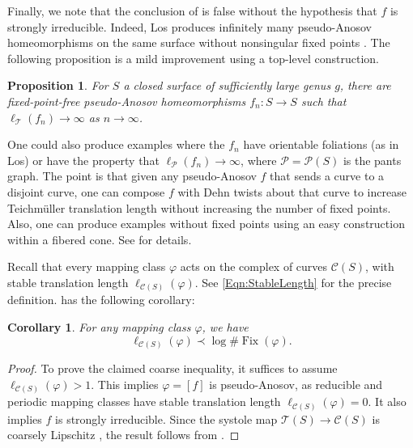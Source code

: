 \documentclass[11pt,letterpaper]{amsart}
\newcommand{\mc}{\mathcal}
\newcommand{\teich}{\mathcal T}
\newcommand{\Fix}{\operatorname{Fix}}
\numberwithin{equation}{section}
\newtheorem{proposition}[theorem]{Proposition}
\newtheorem{corollary}[theorem]{Corollary}
\theoremstyle{definition}
\newcommand{\T}{\mathcal{T}}
\newcommand{\C}{\mathcal{C}}
\begin{document}
Finally, we note that the conclusion of  is false without the hypothesis that $f$ is strongly irreducible. Indeed, Los produces infinitely many pseudo-Anosov homeomorphisms on the same surface without nonsingular fixed points \cite{Los:Infinite}. The following proposition is a mild improvement using a top-level construction. 





\begin{proposition}\label{prop:FPF}
For $S$ a closed surface of sufficiently large genus $g$, there are fixed-point-free pseudo-Anosov homeomorphisms $f_n \colon S \to S$ such that $\ell_{\T}(f_n) \to \infty$ as $n \to \infty$.
\end{proposition}


One could also produce examples where the $f_n$ have orientable foliations (as in Los) or have the property that $\ell_{\mc P}(f_n) \to \infty$, where $\mc P = \mc P(S)$ is the pants graph. 
%
The point is that given any pseudo-Anosov $f$ that sends a curve to a disjoint curve, one can compose $f$ with Dehn twists about that curve to increase Teichm\"uller translation length without increasing the number of fixed points. Also, one can produce examples without fixed points using an easy construction within a fibered cone.
See  for details.


Recall that every mapping class $\varphi$ acts on the complex of curves $\C(S)$, with stable translation length $\ell_{\C(S)}(\varphi)$. 
See \eqref{Eqn:StableLength} for the precise definition. 
 has the following corollary:

\begin{corollary}\label{Cor:CurveGraphFixedPoints}
For any mapping class $\varphi$,
we have
\[
\ell_{\C(S)}(\varphi) \prec \log \# \Fix(\varphi).
\]
\end{corollary}

\begin{proof}
To prove the claimed coarse inequality,  it suffices to assume $\ell_{\C(S)}(\varphi) > 1$. This implies $\varphi = [f]$ is pseudo-Anosov, as reducible and periodic mapping classes have stable translation length $\ell_{\C(S)}(\varphi) = 0$. It also implies $f$ is strongly irreducible.
Since the systole map $\teich(S) \to \C(S)$ is coarsely Lipschitz \cite{MasurMinsky1}, the result follows from .
\end{proof}
\end{document}

